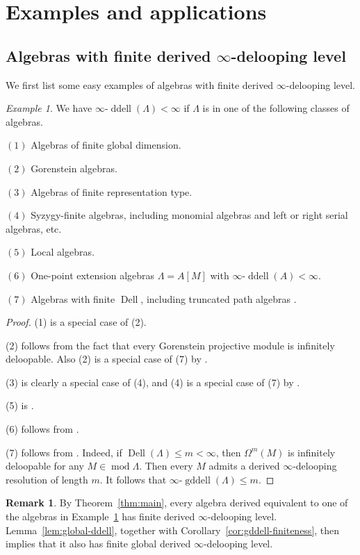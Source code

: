\documentclass[12pt,a4paper,reqno]{amsart}
\theoremstyle{plain}
\theoremstyle{definition}
\newtheorem{remark}[theorem]{Remark}
\theoremstyle{remark}
\newtheorem{example}[theorem]{Example}
\DeclareMathOperator{\modd}{mod}
\DeclareMathOperator{\ddell}{ddell}
\DeclareMathOperator{\Dell}{Dell}
\DeclareMathOperator{\gddell}{gddell}
\begin{document}
\section{Examples and applications}\label{sec:examples}

\subsection{Algebras with finite derived $\infty$-delooping level}

We first list some easy examples of algebras with finite   derived $\infty$-delooping level.

\begin{example}\label{exm:f-ddell}
We have $\infty$-$\ddell(\Lambda)<\infty$ if $\Lambda$ is in one of the following classes of algebras.

$(1)$ Algebras of finite global dimension.

$(2)$ Gorenstein algebras.
    
$(3)$ Algebras of finite representation type.
    
$(4)$ Syzygy-finite algebras, including monomial algebras and left or right serial algebras, etc.

$(5)$ Local algebras.

$(6)$ One-point extension algebras $\Lambda=A[M]$ with $\infty$-$\ddell(A) < \infty$.

$(7)$ Algebras with finite $\Dell$, including truncated path algebras \cite{BLM}.
\end{example}

\begin{proof}
(1) is a special case of (2).

(2) follows from the fact that every Gorenstein projective module is infinitely deloopable. Also (2) is a special case of (7) by \cite[Theorem 3.5]{BLM}.

(3) is clearly a special case of (4), and (4) is a special case of (7) by \cite[Proposition 3.9]{BLM}.

(5) is \cite[Theorem 3.5]{GuoIgusa}.
 
 (6) follows from \cite[the sentence after   Corollary 3.6]{GuoIgusa}. 

(7) follows from \cite[Proposition 3.7]{BLM}. Indeed, if $\Dell(\Lambda)\le m< \infty$, then $\Omega^m(M)$ is infinitely deloopable for any $M\in \modd \Lambda$. Then every $M$ admits a derived $\infty$-delooping resolution of length $m$. It follows that $\infty$-$\gddell(\Lambda)\le m$.
\end{proof}
\begin{remark}
  By Theorem~\ref{thm:main}, every algebra derived equivalent to one of the algebras in Example~\ref{exm:f-ddell} has finite derived $\infty$-delooping level. Lemma~\ref{lem:global-ddell}, together with Corollary~\ref{cor:gddell-finiteness}, then implies that it also has finite global derived $\infty$-delooping level.
\end{remark}
\end{document}
